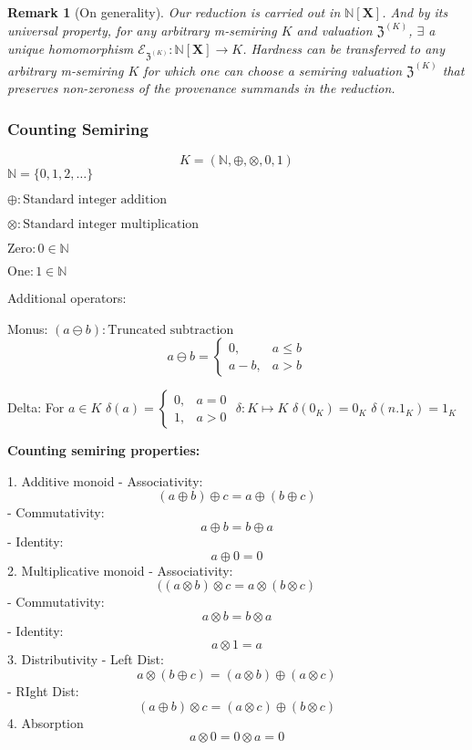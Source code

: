 \documentclass[10pt,a4paper]{scrartcl}
\newtheorem{corollary}{Corollary}[theorem]
\newtheorem*{remark}{Remark}
\theoremstyle{definition}
\theoremstyle{remark}
\begin{document}
\begin{remark}[On generality]
Our reduction is carried out in $\mathbb{N}[\mathbf{X}]$. And by its universal property, for any arbitrary m-semiring $K$ 
  and valuation $\mathfrak{Z}^{(K)}$, $\exists$ a unique homomorphism $\mathcal{E}_{\mathfrak{Z}^{(K)}}:\mathbb{N}[\mathbf{X}]\rightarrow K$. Hardness can be transferred 
  to any arbitrary m-semiring $K$ for which one can choose a semiring valuation $\mathfrak{Z}^{(K)}$ that preserves non-zeroness of the provenance summands in the reduction.
\end{remark}
\subsubsection{Counting Semiring}
$$K = (\mathbb{N}, \oplus, \otimes, 0, 1)$$
$\mathbb{N} = \{0,1,2,\dots\}$

$\oplus : \text{Standard integer addition}$

$\otimes : \text{Standard integer multiplication}$

$\text{Zero} : 0 \in \mathbb{N}$

$\text{One} : 1 \in \mathbb{N}$

Additional operators:

Monus: $(a \ominus b): \text{Truncated subtraction}$
$$ a \ominus b = \begin{cases} 0, &  a\leq b\\ a-b,& a>b \end{cases}$$

Delta: 
For $a \in K$
$\delta(a) = \begin{cases} 0, & a=0\\ 1, & a>0 \end{cases}$
$\delta:K \mapsto K $
$\delta(0_K)=0_K$
$\delta(n.1_K)=1_K$


\textbf{Counting semiring properties:}

1. Additive monoid
- Associativity: $$(a \oplus b) \oplus c = a \oplus (b\oplus c)$$
- Commutativity: $$a \oplus b = b \oplus a$$
- Identity: $$a \oplus 0 = 0$$
2. Multiplicative monoid
- Associativity: $$( (a \otimes b) \otimes c = a \otimes (b\otimes c)$$
- Commutativity: $$a \otimes b = b \otimes a$$
- Identity: $$a \otimes 1 = a$$
3. Distributivity
- Left Dist: $$a \otimes (b \oplus c)= (a \otimes b)\oplus(a \otimes c)$$
- RIght Dist: $$(a \oplus b)\otimes c=(a \otimes c)\oplus(b \otimes c)$$
 4. Absorption
$$a \otimes 0 = 0 \otimes a = 0$$
\end{document}
